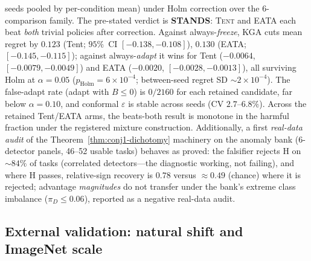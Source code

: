 \documentclass[conference]{IEEEtran}
\theoremstyle{plain}
\theoremstyle{definition}
\begin{document}
seeds pooled by per-condition mean) under Holm correction over the $6$-comparison
family. The pre-stated verdict is \textbf{STANDS}: \textsc{Tent} and \textsc{EATA}
each beat \emph{both} trivial policies after correction. Against always-\emph{freeze},
\textsc{KGA} cuts mean regret by $0.123$ (Tent; $95\%$~CI $[-0.138,-0.108]$),
$0.130$ (EATA; $[-0.145,-0.115]$); against
always-\emph{adapt} it wins for Tent ($-0.0064$, $[-0.0079,-0.0049]$) and EATA
($-0.0020$, $[-0.0028,-0.0013]$), all surviving Holm at $\alpha{=}0.05$
($p_{\mathrm{Holm}}{=}6\times10^{-4}$; between-seed regret SD ${\sim}2\times10^{-4}$).
The false-adapt rate (adapt with $B\le0$) is $0/2160$ for each retained candidate, far below
$\alpha{=}0.10$, and conformal $\varepsilon$ is stable across seeds (CV $2.7$--$6.8\%$).
Across the retained Tent/EATA arms, the beats-both result is monotone in the harmful fraction
under the registered mixture construction. Additionally,
a first \emph{real-data audit} of the
Theorem~\ref{thm:conj1-dichotomy} machinery on the anomaly bank (6-detector panels,
46--52 usable tasks) behaves as proved: the falsifier rejects H on ${\sim}84\%$ of
tasks (correlated detectors---the diagnostic working, not failing), and where H passes,
relative-sign recovery is $0.78$ versus ${\approx}0.49$ (chance) where it is rejected;
advantage \emph{magnitudes} do not transfer under the bank's extreme class imbalance
($\pi_D\le0.06$), reported as a negative real-data audit.

\subsection{External validation: natural shift and ImageNet scale}\label{sec:external}
\end{document}
